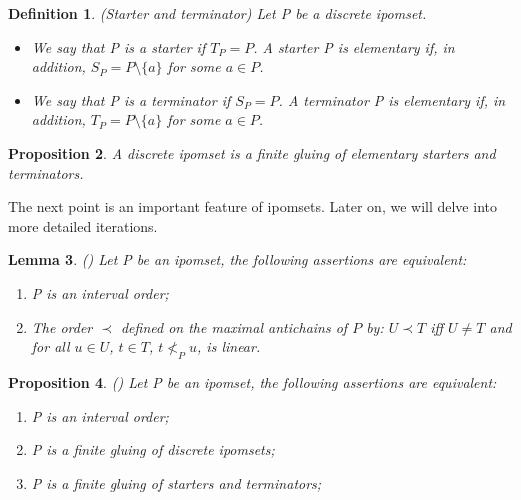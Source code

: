 \documentclass[11pt,a4paper,oldfontcommands]{memoir}
\newtheorem{definition}{Definition}
\newtheorem{lemma}[definition]{Lemma}
\newtheorem{proposition}[definition]{Proposition}
\begin{document}
\begin{definition} (Starter and terminator)
    Let P be a discrete ipomset. 


    \begin{itemize}
        \item We say that P is a starter if $T_P=P$. A starter P is elementary if, in addition, $S_P= P \setminus \{ a \}$ for some $a \in P$.
        \item We say that P is a terminator if $S_P=P$. A terminator P is elementary if, in addition, $T_P= P \setminus \{ a \}$ for some $a \in P$.
    \end{itemize}
    \end{definition}

  \begin{proposition}
        A discrete ipomset is a finite gluing of elementary starters and terminators.
 \end{proposition}
The next point is an important feature of ipomsets. Later on, we will delve into more detailed iterations.

\begin{lemma}
 (\cite{janicki1993structure}) \label{Lemma : decomposition into discrete }
    Let P be an ipomset, the following assertions are equivalent:
    \begin{enumerate}
        \item P is an interval order;
        \item \label{eq: antichain decomposition} The order $\prec$ defined on the maximal antichains of $P$ by: $U \prec T$ iff $U \neq T$ and for all $u \in U$, $t \in T$, $t \nless_P u$, is linear.
    \end{enumerate}
\end{lemma}

\begin{proposition} (\cite{LanguageofHDA}) \label{prop: decomposition into discrete }
    Let P be an ipomset, the following assertions are equivalent:
    \begin{enumerate}
        \item P is an interval order;
        \item \label{eq: maximal dec} P is a finite gluing of discrete ipomsets; 
        \item P is a finite gluing of starters and terminators;
    \end{enumerate}
\end{proposition}
\end{document}
